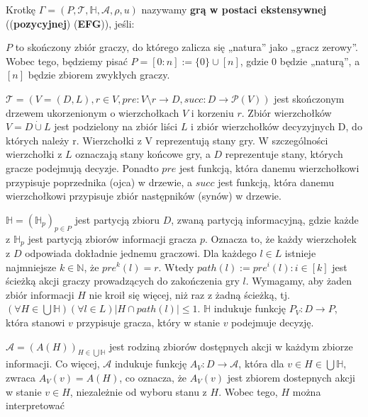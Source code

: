 \begin{definicja}
    Krotkę $\Gamma = (P, \mathcal{T} , \mathbb{H}, \mathcal{A}, \rho, u)$ nazywamy \textbf{grą w postaci ekstensywnej} ((\textbf{pozycyjnej}) (\textbf{EFG})), jeśli:
    \begin{enumerate*}[label=\roman*)]
        \item $P$ to skończony zbiór graczy, do którego zalicza się „natura” jako „gracz zerowy”. Wobec tego, będziemy pisać
        $P = [0 : n] := \{0\} \cup [n]$, gdzie 0 będzie „naturą”, a $[n]$ będzie zbiorem zwykłych graczy.
        \item $\mathcal{T} = (V = (D, L), r \in V, pre : V \setminus {r} \rightarrow D, succ : D \rightarrow \mathcal{P}(V))$
        jest skończonym drzewem ukorzenionym o wierzchołkach $V$ i korzeniu $r$.
        Zbiór wierzchołków $V = D \dot{\cup} L$ jest podzielony na zbiór liści $L$ i zbiór wierzchołków
        decyzyjnych D, do których należy r. Wierzchołki z V reprezentują stany gry. W szczególności wierzchołki z $L$ oznaczają
        stany końcowe gry, a $D$ reprezentuje stany, których gracze podejmują decyzje.
        Ponadto $pre$ jest funkcją, która danemu wierzchołkowi przypisuje poprzednika (ojca) w drzewie, a $succ$ jest funkcją,
        która danemu wierzchołkowi przypisuje zbiór następników (synów) w drzewie.
        \item $\mathbb{H} = (\mathbb{H}_p)_{p \in P}$ jest partycją zbioru $D$, zwaną partycją informacyjną, gdzie każde z $\mathbb{H}_p$
        jest partycją zbiorów informacji gracza $p$. Oznacza to, że każdy wierzchołek z $D$ odpowiada dokładnie jednemu graczowi.
        Dla każdego $l \in L$ istnieje najmniejsze $k \in \mathbb{N}$, że $pre^k(l) = r$. Wtedy $path(l) := pre^i(l) : i \in [k]$ jest ścieżką akcji
        graczy prowadzących do zakończenia gry $l$.
        Wymagamy, aby żaden zbiór informacji $H$ nie kroił się więcej, niż raz z żadną ścieżką, tj. $(\forall H \in \bigcup\mathbb{H})(\forall l \in L) |H \cap path(l)| \leq 1$.
        $\mathbb{H}$ indukuje funkcję $P_V : D \rightarrow P$, która stanowi $v$ przypisuje gracza, który w stanie $v$ podejmuje decyzję.
        \item $\mathcal{A} =  (A(H))_{H \in \bigcup \mathbb{H}}$ jest rodziną zbiorów dostępnych akcji w każdym zbiorze informacji.
        Co więcej, $\mathcal{A}$ indukuje funkcję $A_V : D \rightarrow \mathcal{A}$, która dla $v \in H \in \bigcup \mathbb{H}$, zwraca $A_V(v) = A(H)$, co oznacza, że $A_V(v)$
        jest zbiorem dostepnych akcji w stanie $v \in H$, niezależnie od wyboru stanu z $H$. Wobec tego, $H$ można interpretować

\end{enumerate*}
\end{definicja}
